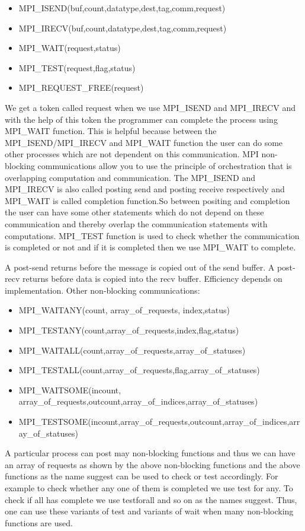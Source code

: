 \documentclass[12pt]{book}
\begin{document}
\begin{itemize}
    \item MPI\_ISEND(buf,count,datatype,dest,tag,comm,request)
    \item MPI\_IRECV(buf,count,datatype,dest,tag,comm,request)
    \item MPI\_WAIT(request,status)
    \item MPI\_TEST(request,flag,status)
    \item MPI\_REQUEST\_FREE(request)
\end{itemize}
We get a token called request when we use MPI\_ISEND and MPI\_IRECV and with the help of this token the programmer can complete the process using MPI\_WAIT function. This is helpful because between the MPI\_ISEND/MPI\_IRECV and MPI\_WAIT function the user can do some other processes which are not dependent on this communication. MPI non-blocking communications allow you to use the principle of orchestration that is overlapping computation and communication. The MPI\_ISEND and MPI\_IRECV is also called posting send and posting receive respectively and MPI\_WAIT is called completion function.So between positing and completion the user can have some other statements which do not depend on these communication and thereby overlap the communication statements with computations. MPI\_TEST function is used to check whether the communication is completed or not and if it is completed then we use MPI\_WAIT to complete.

A post-send returns before the message is copied out of the send buffer. A post-recv returns before data is copied into the recv buffer. Efficiency depends on implementation.
Other non-blocking communications:
\begin{itemize}
    \item MPI\_WAITANY(count, array\_of\_requests, index,status)
    \item MPI\_TESTANY(count,array\_of\_requests,index,flag,status)
    \item MPI\_WAITALL(count,array\_of\_requests,array\_of\_statuses)
    \item MPI\_TESTALL(count,array\_of\_requests,flag,array\_of\_statuses)
    \item MPI\_WAITSOME(incount, array\_of\_requests,outcount,array\_of\_indices,array\_of\_statuses)
    \item MPI\_TESTSOME(incount,array\_of\_requests,outcount,array\_of\_indices,array\_of\_statuses)
\end{itemize}
A particular process can post may non-blocking functions and thus we can have an array of requests as shown by the above non-blocking functions and the above functions as the name suggest can be used to check or test accordingly. For example to check whether any one of them is completed we use test for any. To check if all has complete we use testforall and so on as the names suggest. Thus, one can use these variants of test and variants of wait when many non-blocking functions are used.
\end{document}
